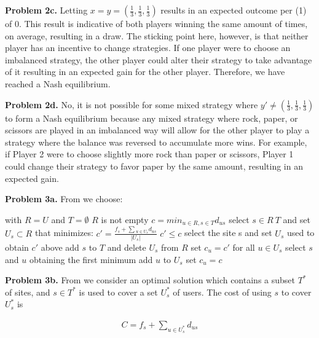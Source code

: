 \documentclass{article}
\begin{document}
\hfill

\textbf{Problem 2c.} Letting $x = y = (\frac{1}{3}, \frac{1}{3}, \frac{1}{3})$ results in an expected outcome per (1) of 0. This result is indicative of both players winning the same amount of times, on average, resulting in a draw. The sticking point here, however, is that neither player has an incentive to change strategies. If one player were to choose an imbalanced strategy, the other player could alter their strategy to take advantage of it resulting in an expected gain for the other player. Therefore, we have reached a Nash equilibrium. 

\hfill

\textbf{Problem 2d.} No, it is not possible for some mixed strategy  where $y' \neq (\frac{1}{3}, \frac{1}{3}, \frac{1}{3})$ to form a Nash equilibrium because any mixed strategy where rock, paper, or scissors are played in an imbalanced way will allow for the other player to play a strategy where the balance was reversed to accumulate more wins. For example, if Player 2 were to choose slightly more rock than paper or scissors, Player 1 could change their strategy to favor paper by the same amount, resulting in an expected gain.

\hfill

\textbf{Problem 3a.} From \cite{website:1} we choose:

\begin{codebox}
    \li with $R = U$ and $T = \emptyset$
    \li \While $R$ is not empty \Do
    \li $c = min_{u \in R, s \in T} d_{us}$
    \li select $s \in R \ T$ and set $U_s \subset R$ that minimizes: $c' = \frac{f_s + \sum{}_{u \in U_s}d_{us}}{|U_s|}$
    \li
    \li \If $c' \leq c$ \Then
    \li select the site s and set $U_s$ used to obtain $c'$ above
    \li add $s$ to $T$ and delete $U_s$ from $R$
    \li set $c_u = c'$ for all $u \in U_s$
    \li
    \li \Else
    \li select $s$ and $u$ obtaining the first minimum
    \li add $u$ to $U_s$
    \li set $c_u = c$ \End \End
\end{codebox}

\hfill

\textbf{Problem 3b.} From \cite{website:1} we consider an optimal solution which contains a subset $T^*$ of sites, and $s \in T^*$ is used to cover a set $U_s^*$ of users. The cost of using $s$ to cover $U_s^*$ is

\begin{gather}
    C = f_s + \sum_{u \in U_s^*}d_{us}    
\end{gather}
\end{document}
